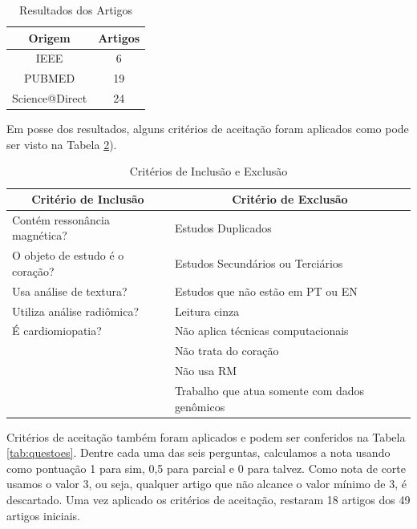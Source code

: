 \begin{table}[hbtp]
    \centering
    \renewcommand{\arraystretch}{1.4} %
    \begin{tabular}{|c|c|}
    \hline 
          \textbf{Origem} & \textbf{Artigos}  \\ 
    \hline 
        IEEE & 6 \\ 
        PUBMED & 19 \\ 
        Science@Direct & 24 \\ 
    \hline 
    \end{tabular} 
    \caption{Resultados dos Artigos}
    \label{tab:resultado_busca}
\end{table}

Em posse dos resultados, alguns critérios de aceitação foram aplicados como pode ser visto na Tabela \ref{tab:criterios}).

\begin{table}[hbtp]
    \centering
    \renewcommand{\arraystretch}{1.4} %
    \begin{tabular}{|l|l|}
    \hline 
          \multicolumn{1}{|c|}{\textbf{Critério de Inclusão}} & \multicolumn{1}{c|}{\textbf{Critério de Exclusão}}  \\ 
    \hline 
        \quad Contém ressonância magnética? & \quad Estudos Duplicados   \\ 
        \quad O objeto de estudo é o coração? & \quad Estudos Secundários ou Terciários \\
        \quad Usa análise de textura? & \quad Estudos que não estão em PT ou EN\\
        \quad Utiliza análise radiômica? & \quad Leitura cinza  \\
        \quad É cardiomiopatia? & \quad Não aplica técnicas computacionais\\
        & \quad Não trata do coração \\
        & \quad Não usa RM \\
        & \quad Trabalho que atua somente com dados genômicos \\ 
    \hline 
    \end{tabular} 
    \caption{Critérios de Inclusão e Exclusão}
    \label{tab:criterios}
\end{table}

Critérios de aceitação também foram aplicados e podem ser conferidos na Tabela \ref{tab:questoes}. Dentre cada uma das seis perguntas, calculamos a nota usando como pontuação 1 para sim, 0,5 para parcial e 0 para talvez. Como nota de corte usamos o valor 3, ou seja, qualquer artigo que não alcance o valor mínimo de 3, é descartado. Uma vez aplicado os critérios de aceitação, restaram 18 artigos dos 49 artigos iniciais.

